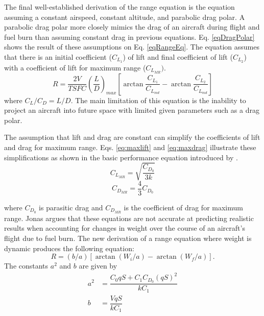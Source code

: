 The final well-established derivation of the range equation is the equation assuming a constant airspeed, constant altitude, and parabolic drag polar. A parabolic drag polar more closely mimics the drag of an aircraft during flight and fuel burn than assuming constant drag in previous equations. Eq. \ref{eqDragPolar} shows the result of these assumptions on Eq. \ref{eqRangeEq}. The equation assumes that there is an initial coefficient ($C_{L_1}$) of lift and final coefficient of lift ($C_{L_2}$) with a coefficient of lift for maximum range ($C_{L_{MR}})$.
\begin{equation}
\label{eqDragPolar}
    R = \dfrac{2V}{TSFC}\left(\dfrac{L}{D}\right)_{max}\left[\arctan\dfrac{C_{L_1}}{C_{L_{md}}}-\arctan\dfrac{C_{L_2}}{C_{L_{md}}}\right]
\end{equation}
where $C_L/C_D = L/D$. The main limitation of this equation is the inability to project an aircraft into future space with limited given parameters such as a drag polar.\par
The assumption that lift and drag are constant can simplify the coefficients of lift and drag for maximum range. Eqs. \ref{eq:maxlift} and \ref{eq:maxdrag} illustrate these simplifications as shown in the basic performance equation introduced by \cite{OptimizeBreguet}.
\begin{equation}
C_{L_{MR}} = \sqrt{\dfrac{C_{D_0}}{3k}}
\label{eq:maxlift}
\end{equation}
\begin{equation}
C_{D_{MR}} = \dfrac{4}{3}C_{D_0}
\label{eq:maxdrag}
\end{equation}
\par
where $C_{D_0}$ is parasitic drag and $C_{D_{MR}}$ is the coefficient of drag for maximum range. Jonas \cite{Jonas} argues that these equations are not accurate at predicting realistic results when accounting for changes in weight over the course of an aircraft's flight due to fuel burn. The new derivation of a range equation where weight is dynamic produces the following equation:
\begin{equation}
    R = (b/a)[\arctan(W_i/a)-\arctan(W_f/a)].
    \label{eq:dynamicrange}
\end{equation}
The constants $a^2$ and $b$ are given by 
\begin{equation}
    \begin{aligned}
        a^2 &= \dfrac{C_0qS+C_1C_{D_0}(qS)^2}{k C_1}\\
        b &= \dfrac{VqS}{k C_1}
    \end{aligned}
\end{equation}
